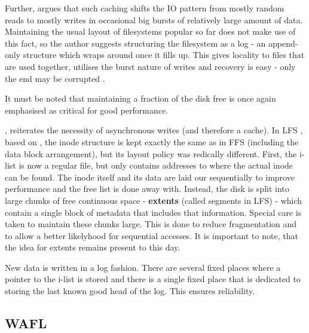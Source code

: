             Further, \citeauthor{IO_bottleneck} argues that such caching shifts
            the IO pattern from mostly random reads to mostly writes in
            occasional big bursts of relatively large amount of data.
            Maintaining the usual layout of filesystems popular so far does not
            make use of this fact, so the author suggests structuring the
            filesystem as a log - an append-only structure which wraps around
            once it fills up. This gives locality to files that are used
            together, utilises the burst nature of writes and recovery is easy
            - only the end may be corrupted \cite{IO_bottleneck}.

            It must be noted that maintaining a fraction of the disk free is
            once again emphasised as critical for good performance.

            \citeauthor{LFS}, reiterates the necessity of asynchronous writes
            (and therefore a cache). In LFS \cite{LFS}, based on
            \cite{IO_bottleneck}, the inode structure is kept exactly the same
            as in FFS (including the data block arrangement), but its layout
            policy was redically different. First, the i-list is now a regular
            file, but only contains addresses to where the actual inode can be
            found. The inode itself and its data are laid our sequentially to
            improve performance and the free list is done away with. Instead,
            the disk is split into large chunks of free continuous space -
            \textbf{extents} (called segments in LFS) - which contain a single
            block of metadata that includes that information.  Special care is
            taken to maintain these chunks large.  This is done to reduce
            fragmentation and to allow a better likelyhood for sequential
            accesses. It is important to note, that the idea for extents
            remains present to this day.

            New data is written in a log fashion. There are several fixed
            places where a pointer to the i-list is stored and there is a
            single fixed place that is dedicated to storing the last known good
            head of the log. This ensures reliability.

        \subsection{WAFL}
            \label{sec_WAFL}

